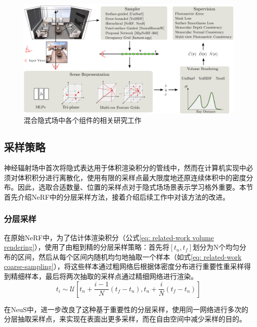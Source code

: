 \begin{figure}[t]
    \centering
    \includegraphics[width=\textwidth]{undergraduate-thesis/images/sdfstudio.png}
    \caption{混合隐式场中各个组件的相关研究工作\cite{yu_sdfstudio_2022}}
    \label{fig:related-work sdfstudio}
\end{figure}

\subsection{采样策略}
神经辐射场中首次将隐式表达用于体积渲染积分的管线中，然而在计算机实现中必须对体积积分进行离散化，使用有限的采样点最大限度地还原连续体积中的密度分布。因此，选取合适数量、位置的采样点对于隐式场场景表示学习格外重要。本节首先介绍NeRF\cite{mildenhall_nerf_2020}中的分层采样方法，接着介绍后续工作中对该方法的改进。

\subsubsection{分层采样}
\label{sec: coarse-to-fine sampling}
在原始NeRF中，为了估计体渲染积分（公式\ref{eq: related-work volume rendering}），使用了由粗到精的分层采样策略：首先将$[t_n,t_f]$划分为N个均匀分布的区间，然后从每个区间内随机均匀地抽取一个样本（如式\ref{eq: related-work coarse-sampling}），将这些样本通过粗网络后根据体密度分布进行重要性重采样得到精细样本，最后将两次抽取的采样点通过精细网络进行渲染。
\begin{equation}
    t_i\sim\mathcal{U}\left[t_n+\frac{i-1}{N}(t_f-t_n), t_n+\frac{i}{N}(t_f-t_n)\right]
    \label{eq: related-work coarse-sampling}
\end{equation}

在NeuS\cite{wang_neus_2021}中，进一步改良了这种基于重要性的分层采样，使用同一网络进行多次的分层抽取采样点，来实现在表面出更多采样，而在自由空间中减少采样的目的。


